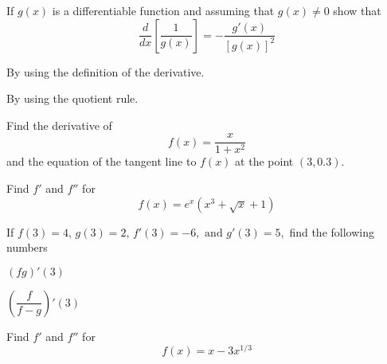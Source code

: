 \documentclass[unboxed]{hwset}
\begin{document}
\begin{problem}[1.]
	If $g(x)$ is a differentiable function and assuming that $g(x) \ne 0$ show
	that
	\begin{equation*}
		\frac{d}{dx}\left[\frac{1}{g(x)}\right] = -\frac{g'(x)}{[g(x)]^2}
	\end{equation*}
	\be
	\item By using the definition of the derivative.
	\item By using the quotient rule.
	\ee
\end{problem}

\begin{problem}[2.]
	Find the derivative of 
	\begin{equation*}
		f(x) = \frac{x}{1+x^2}
	\end{equation*}
	and the equation of the tangent line to $f(x)$ at the point $(3,0.3)$.
\end{problem}

\begin{problem}[3.] 
	Find $f'$ and $f''$ for
	\begin{equation*}
		f(x) = e^{x}(x^3 + \sqrt{x} +1)
	\end{equation*}
\end{problem}

\begin{problem}[4.] 
	If $f(3) = 4,\, g(3) = 2,\, f'(3) = -6, \text{ and } g'(3) = 5,$ find the
	following numbers
	\be
		\item $(fg)'(3)$
		\item $\left(\dfrac{f}{f-g}\right)'(3)$
	\ee
\end{problem}

\begin{problem}[5.]
	Find $f'$ and $f''$ for
	\begin{equation*}
		f(x) = x - 3x^{1/3}
	\end{equation*}
\end{problem}
\end{document}
